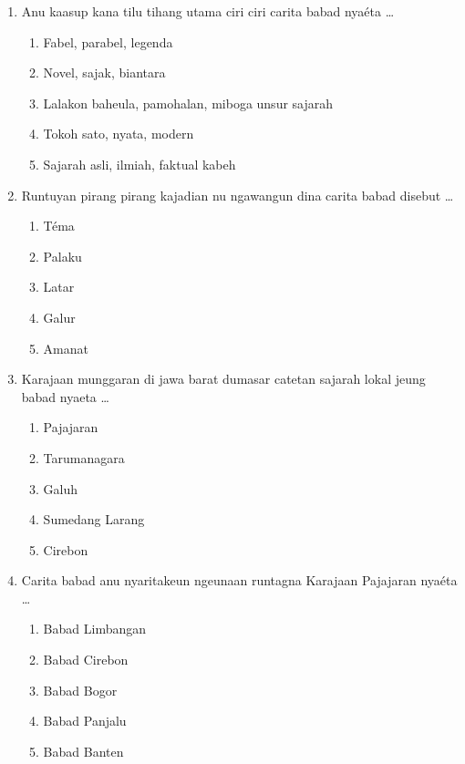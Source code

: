 \documentclass[12pt,a4paper]{article}
\begin{document}
\begin{enumerate}[leftmargin=*]
\item Anu kaasup kana tilu tihang utama ciri ciri carita babad nyaéta \dots
    \begin{enumerate}[label=\alph*.]
        \item Fabel, parabel, legenda
        \item Novel, sajak, biantara
        \item Lalakon baheula, pamohalan, miboga unsur sajarah
        \item Tokoh sato, nyata, modern
        \item Sajarah asli, ilmiah, faktual kabeh
    \end{enumerate}

\item Runtuyan pirang pirang kajadian nu ngawangun dina carita babad disebut \dots
    \begin{enumerate}[label=\alph*.]
        \item Téma
        \item Palaku
        \item Latar
        \item Galur
        \item Amanat
    \end{enumerate}

\item Karajaan munggaran di jawa barat dumasar catetan sajarah lokal jeung babad nyaeta \dots
    \begin{enumerate}[label=\alph*.]
        \item Pajajaran
        \item Tarumanagara
        \item Galuh
        \item Sumedang Larang
        \item Cirebon
    \end{enumerate}

\item Carita babad anu nyaritakeun ngeunaan runtagna Karajaan Pajajaran nyaéta \dots
    \begin{enumerate}[label=\alph*.]
        \item Babad Limbangan
        \item Babad Cirebon
        \item Babad Bogor
        \item Babad Panjalu
        \item Babad Banten
    \end{enumerate}


\end{enumerate}
\end{document}
